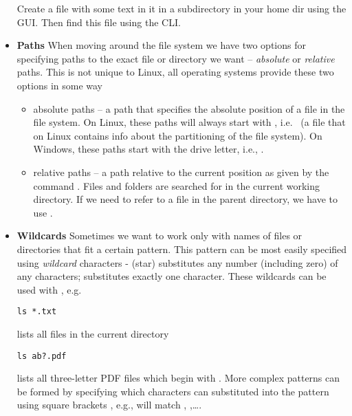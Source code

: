 \begin{itemize}
  \begin{exercise}
    Create a file with some text in it in a subdirectory in your home dir using the GUI. Then find this file using the CLI.
  \end{exercise} 
\item
  \textbf{Paths} When moving around the file system we have two options for specifying paths to the exact file or directory we want -- \emph{absolute} or \emph{relative} paths. This is not unique to Linux, all operating systems provide these two options in some way

  \begin{itemize}
  \item
    absolute paths -- a path that specifies the absolute position of a file in the file system. On Linux, these paths will always start with \ls{/}, i.e.~ (a file that on Linux contains info about the partitioning of the file system). On Windows, these paths start with the drive letter, i.e., .
  \item
    relative paths -- a path relative to the current position as given by the command . Files and folders are searched for in the current working directory. If we need to refer to a file in the parent directory, we have to use .
  \end{itemize}
\item
  \textbf{Wildcards}
  Sometimes we want to work only with names of files or directories that fit a certain pattern. This pattern can be most easily specified using \emph{wildcard} characters - \ls{\*} (star) substitutes any number (including zero) of any characters;  substitutes exactly one character. These wildcards can be used with , e.g.
\begin{lstlisting}
ls *.txt
\end{lstlisting}
  lists all  files in the current directory
\begin{lstlisting}
ls ab?.pdf    
\end{lstlisting}
  lists all three-letter PDF files which begin with . More complex patterns can be formed by specifying which characters can substituted into the pattern using square brackets \ls{[]},
  e.g.,  will match , ,\ldots{}.


\end{itemize}
